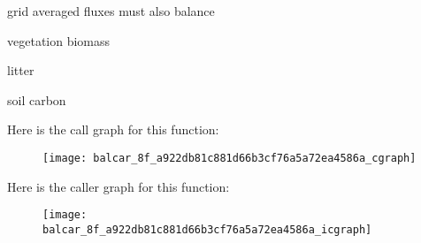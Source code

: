 grid averaged fluxes must also balance

vegetation biomass

litter

soil carbon

Here is the call graph for this function\+:\nopagebreak
\begin{figure}[H]
\begin{center}
\leavevmode
\texttt{[image: balcar\_8f\_a922db81c881d66b3cf76a5a72ea4586a\_cgraph]}
\end{center}
\end{figure}




Here is the caller graph for this function\+:\nopagebreak
\begin{figure}[H]
\begin{center}
\leavevmode
\texttt{[image: balcar\_8f\_a922db81c881d66b3cf76a5a72ea4586a\_icgraph]}
\end{center}
\end{figure}


